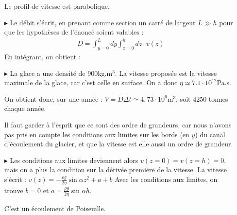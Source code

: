 \documentclass{report}
\begin{document}
\begin{itemize}
\noindent{}

Le profil de vitesse est parabolique.

\item[$\blacktriangleright$] Le débit s'écrit, en prenant comme section un carré de largeur $L\gg h$ pour que les hypothèses de l'énoncé soient valables : 
\begin{align*}
	D=\int_{y=0}^{L}dy\int_{z=0}^h dz\cdot v(z)
\end{align*}
En intégrant, on obtient :

\noindent{}

\item[$\blacktriangleright$] La glace a une densité de 900kg.m$^3$. La vitesse proposée est la vitesse maximale de la glace, car c'est celle en surface. On a donc $\eta\simeq7.1\cdot10^{12}$Pa.s.

On obtient donc, sur une année : $V=D\Delta t\simeq4,73\cdot10^6$m$^3$, soit 4250 tonnes chaque année. 

Il faut garder à l'esprit que ce sont des ordre de grandeurs, car nous n'avons pas pris en compte les conditions aux limites sur les bords (en $y$) du canal d'écoulement du glacier, et que la vitesse est elle aussi un ordre de grandeur. 

\item[$\blacktriangleright$] Les conditions aux limites deviennent alors $v(z=0)=v(z=h)=0$, mais on a plus la condition sur la dérivée première de la vitesse. 
La vitesse s'écrit : $v(z)=-\frac{\rho g}{2\eta}\sin\alpha z^2 +a +b$
Avec les conditions aux limites, on trouve $b=0$ et $a=\frac{\rho g}{2\eta}\sin\alpha h$.

\noindent{}

C'est un écoulement de Poiseuille. 

\end{itemize}

\newpage
\end{document}
